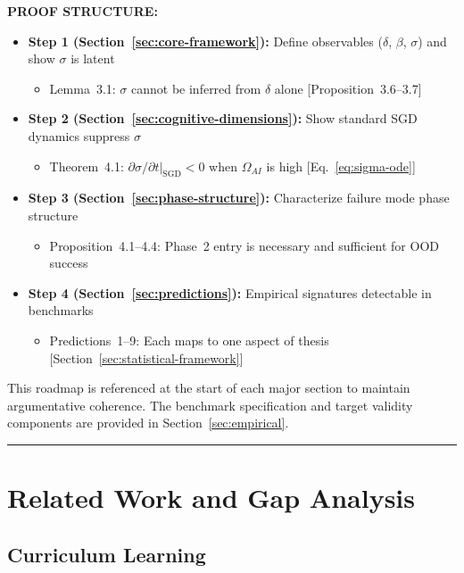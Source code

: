 \documentclass[11pt,a4paper]{article}
\begin{document}
\textbf{PROOF STRUCTURE:}
\begin{itemize}[nosep]
\item \textbf{Step 1 (Section~\ref{sec:core-framework}):} Define observables ($\delta$, $\beta$, $\sigma$) and show $\sigma$ is latent
  \begin{itemize}[nosep]
  \item Lemma~3.1: $\sigma$ cannot be inferred from $\delta$ alone [Proposition~3.6--3.7]
  \end{itemize}
\item \textbf{Step 2 (Section~\ref{sec:cognitive-dimensions}):} Show standard SGD dynamics suppress $\sigma$
  \begin{itemize}[nosep]
  \item Theorem~4.1: $\partial\sigma/\partial t|_{\text{SGD}} < 0$ when $\Omega_{AI}$ is high [Eq.~\eqref{eq:sigma-ode}]
  \end{itemize}
\item \textbf{Step 3 (Section~\ref{sec:phase-structure}):} Characterize failure mode phase structure
  \begin{itemize}[nosep]
  \item Proposition~4.1--4.4: Phase~2 entry is necessary and sufficient for OOD success
  \end{itemize}
\item \textbf{Step 4 (Section~\ref{sec:predictions}):} Empirical signatures detectable in benchmarks
  \begin{itemize}[nosep]
  \item Predictions~1--9: Each maps to one aspect of thesis [Section~\ref{sec:statistical-framework}]
  \end{itemize}
\end{itemize}

This roadmap is referenced at the start of each major section to maintain
argumentative coherence. The benchmark specification and target validity
components are provided in Section~\ref{sec:empirical}.

\noindent\rule{\linewidth}{0.4pt}

\section{Related Work and Gap Analysis}\label{sec:related-work}

\subsection{Curriculum Learning}\label{sec:curriculum-learning}
\end{document}
